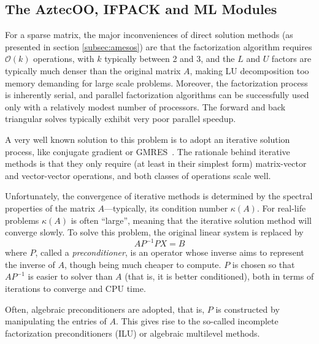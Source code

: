 \documentclass[acmtocl]{acmtrans2m}
\begin{document}
\subsection{The AztecOO, IFPACK and ML Modules}
\label{subsec:aztecoo_ifpack}

For a sparse matrix, the major inconveniences of direct solution
methods (as presented in section \ref{subsec:amesos}) are that 
the factorization algorithm requires $\mathcal{O}(k)$ operations, with $k$
typically between 2 and 3, and the $L$
and $U$ factors are typically much denser than the original matrix
$A$, making LU decomposition too memory demanding for large scale
problems. Moreover, the factorization process is inherently serial,
and parallel factorization algorithms can be successfully used only
with a relatively modest number of processors. The forward and back
triangular solves typically exhibit very poor parallel speedup.

A very well known solution to this problem is to adopt an iterative
solution process, like conjugate gradient or
GMRES~\cite{golub96matrix}. The rationale behind iterative methods
is that they only require (at least in their simplest form)
matrix-vector and vector-vector operations, and both classes of
operations scale well.

Unfortunately, the convergence of iterative methods is determined by
the spectral properties of the matrix $A$---typically, its condition
number $\kappa(A)$.  For real-life problems $\kappa(A)$ is often
``large'', meaning that the iterative solution method will converge
slowly. To solve this problem, the original linear system is replaced
by
\[
A P^{-1} P X = B
\]
where $P$, called a {\sl preconditioner}, is an operator whose inverse
aims to represent the inverse of $A$, though being much cheaper to
compute.  $P$ is chosen so that $AP^{-1}$ is easier to solver than $A$
(that is, it is better conditioned), both in terms of iterations to
converge and CPU time.

\smallskip

Often, algebraic preconditioners are adopted, that is, $P$ is
constructed by manipulating the entries of $A$. This gives rise to the
so-called incomplete factorization preconditioners (ILU) or algebraic
multilevel methods.
\end{document}
